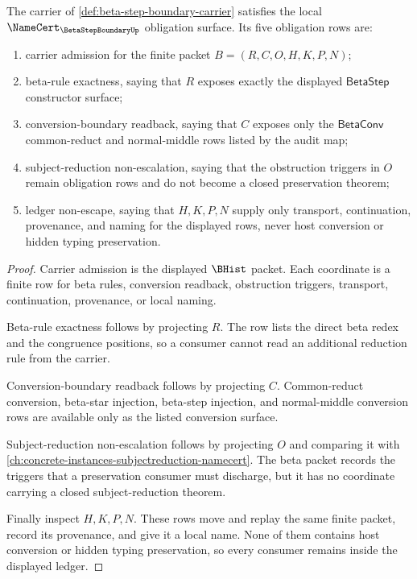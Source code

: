 \begin{theorem}
\label{thm:beta-step-boundary-namecert-obligations}
The carrier of \autoref{def:beta-step-boundary-carrier} satisfies the local
$\NameCert_{\BetaStepBoundaryUp}$ obligation surface. Its five obligation rows
are:
\begin{enumerate}
\item carrier admission for the finite packet $B=(R,C,O,H,K,P,N)$;
\item beta-rule exactness, saying that $R$ exposes exactly the displayed
$\mathsf{BetaStep}$ constructor surface;
\item conversion-boundary readback, saying that $C$ exposes only the
$\mathsf{BetaConv}$ common-reduct and normal-middle rows listed by the audit
map;
\item subject-reduction non-escalation, saying that the obstruction triggers
in $O$ remain obligation rows and do not become a closed preservation theorem;
\item ledger non-escape, saying that $H,K,P,N$ supply only transport,
continuation, provenance, and naming for the displayed rows, never host
conversion or hidden typing preservation.
\end{enumerate}
\end{theorem}
\begin{proof}
Carrier admission is the displayed $\BHist$ packet. Each coordinate is a finite
row for beta rules, conversion readback, obstruction triggers, transport,
continuation, provenance, or local naming.

Beta-rule exactness follows by projecting $R$. The row lists the direct beta
redex and the congruence positions, so a consumer cannot read an additional
reduction rule from the carrier.

Conversion-boundary readback follows by projecting $C$. Common-reduct
conversion, beta-star injection, beta-step injection, and normal-middle
conversion rows are available only as the listed conversion surface.

Subject-reduction non-escalation follows by projecting $O$ and comparing it
with \autoref{ch:concrete-instances-subjectreduction-namecert}. The beta packet
records the triggers that a preservation consumer must discharge, but it has no
coordinate carrying a closed subject-reduction theorem.

Finally inspect $H,K,P,N$. These rows move and replay the same finite packet,
record its provenance, and give it a local name. None of them contains host
conversion or hidden typing preservation, so every consumer remains inside the
displayed ledger.
\end{proof}

